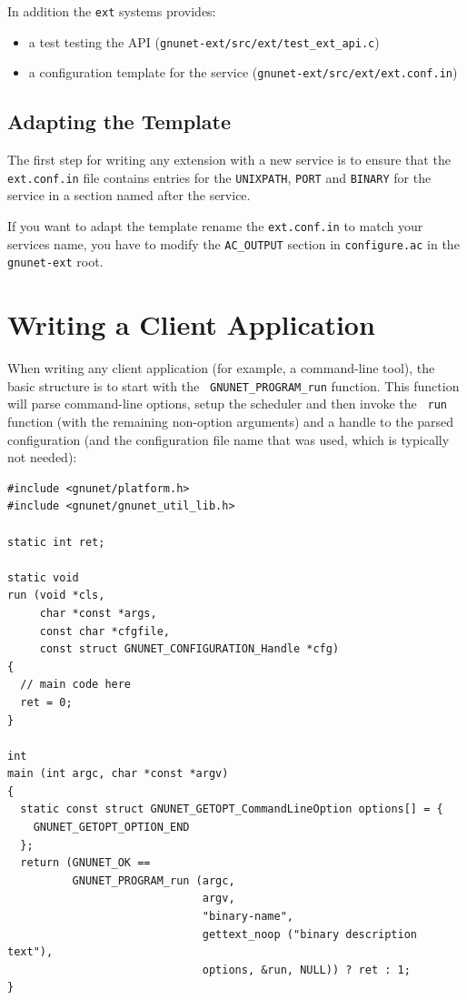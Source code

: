 \documentclass[10pt]{article}
\begin{document}
In addition the \texttt{ext} systems provides:
\begin{itemize}
\itemsep0em
  \item a test testing the API (\lstinline|gnunet-ext/src/ext/test_ext_api.c|)
  \item a configuration template for the service (\lstinline|gnunet-ext/src/ext/ext.conf.in|)
\end{itemize}


\subsection{Adapting the Template}

The first step for writing any extension with a new service is to
ensure that the {\tt ext.conf.in} file contains entries for the
\texttt{UNIXPATH}, \texttt{PORT} and \texttt{BINARY} for the service in a section named after
the service.

If you want to adapt the template rename the {\tt ext.conf.in} to match your
services name, you have to modify the \texttt{AC\_OUTPUT} section in {\tt configure.ac}
in the \texttt{gnunet-ext} root.

\section{Writing a Client Application}

When writing any client application (for example, a command-line
tool), the basic structure is to start with the {\tt
  GNUNET\_PROGRAM\_run} function.  This function will parse
command-line options, setup the scheduler and then invoke the {\tt
  run} function (with the remaining non-option arguments) and a handle
to the parsed configuration (and the configuration file name that was
used, which is typically not needed):

\lstset{language=C}
\begin{lstlisting}
#include <gnunet/platform.h>
#include <gnunet/gnunet_util_lib.h>

static int ret;

static void
run (void *cls,
     char *const *args,
     const char *cfgfile,
     const struct GNUNET_CONFIGURATION_Handle *cfg)
{
  // main code here
  ret = 0;
}

int
main (int argc, char *const *argv)
{
  static const struct GNUNET_GETOPT_CommandLineOption options[] = {
    GNUNET_GETOPT_OPTION_END
  };
  return (GNUNET_OK ==
          GNUNET_PROGRAM_run (argc,
                              argv,
                              "binary-name",
                              gettext_noop ("binary description text"),
                              options, &run, NULL)) ? ret : 1;
}
\end{lstlisting}
\end{document}
